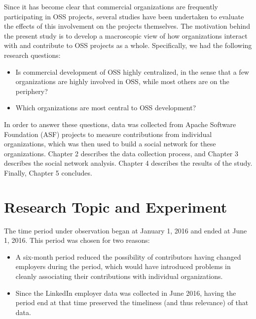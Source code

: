 Since it has become clear that commercial organizations are frequently participating in OSS projects, several studies have been undertaken to evaluate the effects of this involvement on the projects themselves. The motivation behind the present study is to develop a macroscopic view of how organizations interact with and contribute to OSS projects as a whole. Specifically, we had the following research questions:
\begin{itemize}
	\item Is commercial development of OSS highly centralized, in the sense that a few organizations are highly involved in OSS, while most others are on the periphery?
	\item Which organizations are most central to OSS development?
\end{itemize}
In order to answer these questions, data was collected from Apache Software Foundation (ASF) projects to measure contributions from individual organizations, which was then used to build a social network for these organizations. Chapter 2 describes the data collection process, and Chapter 3 describes the social network analysis. Chapter 4 describes the results of the study. Finally, Chapter 5 concludes.

\section{Research Topic and Experiment}
The time period \timeperiod{} under observation began at January 1, 2016 and ended at June 1, 2016. This period was chosen for two reasons:
\begin{itemize}
	\item A six-month period reduced the possibility of contributors having changed employers during the period, which would have introduced problems in cleanly associating their contributions with individual organizations.
	\item Since the LinkedIn employer data was collected in June 2016, having the period end at that time preserved the timeliness (and thus relevance) of that data.
\end{itemize}
